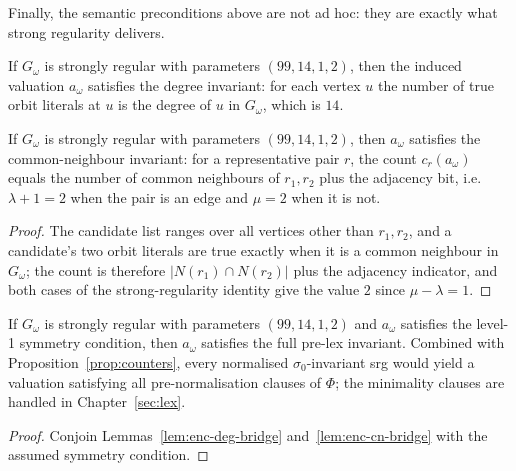 Finally, the semantic preconditions above are not ad hoc: they are exactly
what strong regularity delivers.

\begin{lemma}\label{lem:enc-deg-bridge}
If $G_\omega$ is strongly regular with parameters $(99,14,1,2)$, then the
induced valuation $a_\omega$ satisfies the degree invariant: for each vertex
$u$ the number of true orbit literals at $u$ is the degree of $u$ in
$G_\omega$, which is $14$.
\leanok
{}
\end{lemma}

\begin{lemma}\label{lem:enc-cn-bridge}
If $G_\omega$ is strongly regular with parameters $(99,14,1,2)$, then
$a_\omega$ satisfies the common-neighbour invariant: for a representative
pair $r$, the count $c_r(a_\omega)$ equals the number of common neighbours
of $r_1, r_2$ plus the adjacency bit, i.e.\ $\lambda + 1 = 2$ when the pair
is an edge and $\mu = 2$ when it is not.
\leanok
{}
\end{lemma}

\begin{proof}\leanok
The candidate list ranges over all vertices other than $r_1, r_2$, and a
candidate's two orbit literals are true exactly when it is a common
neighbour in $G_\omega$; the count is therefore
$|N(r_1) \cap N(r_2)|$ plus the adjacency indicator, and both cases of the
strong-regularity identity give the value $2$ since $\mu - \lambda = 1$.
\end{proof}

\begin{proposition}\label{prop:enc-prelex-bridge}
If $G_\omega$ is strongly regular with parameters $(99,14,1,2)$ and
$a_\omega$ satisfies the level-1 symmetry condition, then $a_\omega$
satisfies the full pre-lex invariant.  Combined with
Proposition~\ref{prop:counters}, every normalised $\sigma_0$-invariant srg
would yield a valuation satisfying all pre-normalisation clauses of $\Phi$;
the minimality clauses are handled in Chapter~\ref{sec:lex}.
\leanok
{}
\end{proposition}

\begin{proof}\leanok
Conjoin Lemmas~\ref{lem:enc-deg-bridge} and~\ref{lem:enc-cn-bridge} with the
assumed symmetry condition.
\end{proof}

